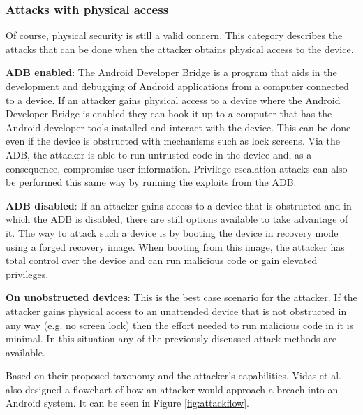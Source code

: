 \documentclass[conference]{IEEEtran}
\begin{document}
\subsubsection{Attacks with physical access}

Of course, physical security is still a valid concern. This category describes the attacks that can be done when the attacker obtains physical access to the device.

\textbf{ADB enabled}: The Android Developer Bridge is a program that aids in the development and debugging of Android applications from a computer connected to a device. If an attacker gains physical access to a device where the Android Developer Bridge is enabled they can hook it up to a computer that has the Android developer tools installed and interact with the device. This can be done even if the device is obstructed with mechanisms such as lock screens. Via the ADB, the attacker is able to run untrusted code in the device and, as a consequence, compromise user information. Privilege escalation attacks can also be performed this same way by running the exploits from the ADB.

\textbf{ADB disabled}: If an attacker gains access to a device that is obstructed and in which the ADB is disabled, there are still options available to take advantage of it. The way to attack such a device is by booting the device in recovery mode using a forged recovery image. When booting from this image, the attacker has total control over the device and can run malicious code or gain elevated privileges.

\textbf{On unobstructed devices}: This is the best case scenario for the attacker. If the attacker gains physical access to an unattended device that is not obstructed in any way (e.g. no screen lock) then the effort needed to run malicious code in it is minimal. In this situation any of the previously discussed attack methods are available.

Based on their proposed taxonomy and the attacker's capabilities, Vidas et al. also designed a flowchart of how an attacker would approach a breach into an Android system. It can be seen in Figure \ref{fig:attackflow}.
\end{document}
